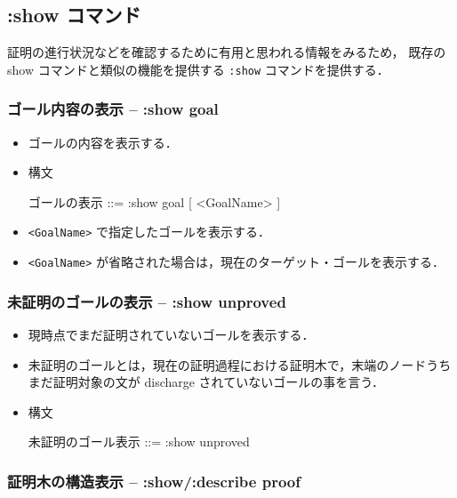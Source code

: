 \documentclass[a4paper,oneside,10pt,here]{memoir}
\newenvironment{vvtm}%
{\parskip=0pt\lineskip=0pt\begin{center}\begin{minipage}{0.8\textwidth}\begin{snugshade}}%
  {\end{snugshade}\end{minipage}\end{center}}
\begin{document}
\subsection{:show コマンド}
証明の進行状況などを確認するために有用と思われる情報をみるため，
既存の show コマンドと類似の機能を提供する \texttt{:show} コマンドを提供する．

\subsubsection{ゴール内容の表示 -- :show goal}
\begin{itemize}
\item ゴールの内容を表示する．
\item 構文
  \begin{vvtm}
    \begin{simplev}
    ゴールの表示 ::= :show goal [ <GoalName> ]
  \end{simplev}
\end{vvtm}
\item \verb|<GoalName>| で指定したゴールを表示する．
\item \verb|<GoalName>| が省略された場合は，現在のターゲット・ゴールを表示する．
\end{itemize}

\subsubsection{未証明のゴールの表示 -- :show unproved}
\begin{itemize}
\item 現時点でまだ証明されていないゴールを表示する．
\item 未証明のゴールとは，現在の証明過程における証明木で，末端のノードうち
  まだ証明対象の文が discharge されていないゴールの事を言う．
\item 構文
  \begin{vvtm}
    \begin{simplev}
      未証明のゴール表示 ::= :show unproved
    \end{simplev}
  \end{vvtm}
\end{itemize}

\subsubsection{証明木の構造表示 -- :show/:describe  proof}
\end{document}
